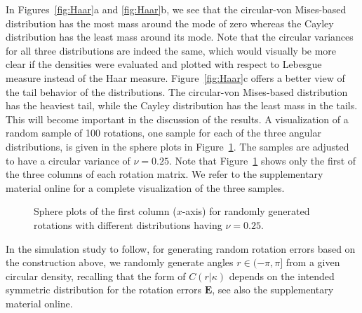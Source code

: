 In Figures~\ref{fig:Haar}a and \ref{fig:Haar}b, we see that the circular-von Mises-based distribution has the most mass around the mode of zero whereas the Cayley distribution has the least mass around its mode.  Note that the circular variances for all three distributions are indeed the same, which would visually be more clear if the densities  were evaluated and plotted with respect to Lebesgue measure instead of the Haar measure. Figure~\ref{fig:Haar}c offers a better view of the tail behavior of the distributions.  The circular-von Mises-based distribution has the heaviest tail, while the Cayley distribution has the least mass in the tails. This will become important in the discussion of the results. A visualization of a random sample of 100 rotations, one sample for each of the three angular distributions, is given in the sphere plots in Figure~\ref{eyeballs}. The samples are adjusted to have a circular variance of $\nu = 0.25$.  Note that Figure~\ref{eyeballs} shows only the first of the three columns of each rotation matrix. We refer to the supplementary material online for a complete visualization of the three samples.
\begin{figure}[htbp]
\centering
{}
\caption{\label{eyeballs}Sphere plots of the first column ($x$-axis) for randomly generated rotations with different distributions having  $\nu = 0.25$.}
\end{figure}
In the simulation study to follow, for generating random rotation errors based on the construction above, we randomly generate angles $r\in(-\pi,\pi]$ from a given circular density, recalling that the form of $C(r|\kappa)$ depends on the intended symmetric distribution for the rotation errors $\bm{E}$, see also the supplementary material online.

